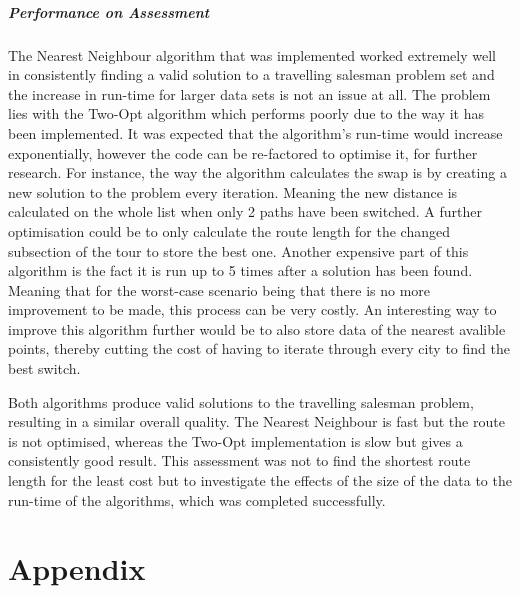 \documentclass[10pt, a4paper]{article}
\begin{document}
	\subparagraph{Performance on Assessment}
	
	The Nearest Neighbour algorithm that was implemented worked extremely well in consistently finding a valid solution to a travelling salesman problem set and the increase in run-time for larger data sets is not an issue at all. The problem lies with the Two-Opt algorithm which performs poorly due to the way it has been implemented. It was expected that the algorithm's run-time would increase exponentially, however the code can be re-factored to optimise it, for further research. For instance, the way the algorithm calculates the swap is by creating a new solution to the problem every iteration. Meaning the new distance is calculated on the whole list when only 2 paths have been switched. A further optimisation could be to only calculate the route length for the changed subsection of the tour to store the best one. Another expensive part of this algorithm is the fact it is run up to 5 times after a solution has been found. Meaning that for the worst-case scenario being that there is no more improvement to be made, this process can be very costly. An interesting way to improve this algorithm further would be to also store data of the nearest avalible points, thereby cutting the cost of having to iterate through every city to find the best switch. \cite{two}
	
	Both algorithms produce valid solutions to the travelling salesman problem, resulting in a similar overall quality. The Nearest Neighbour is fast but the route is not optimised, whereas the Two-Opt implementation is slow but gives a consistently good result. This assessment was not to find the shortest route length for the least cost but to investigate the effects of the size of the data to the run-time of the algorithms, which was completed successfully.
   
   
   

\newpage
\clearpage
\section{Appendix}





		
\end{document}
